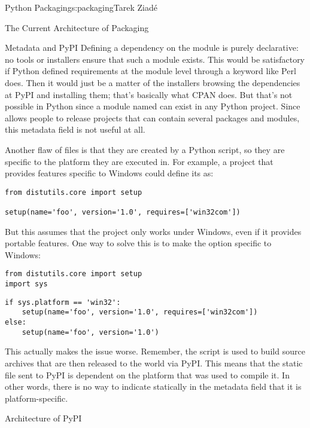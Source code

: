 \begin{aosachapter}{Python Packaging}{s:packaging}{Tarek Ziad\'{e}}
\begin{aosasect1}{The Current Architecture of Packaging}
\begin{aosasect2}{Metadata and PyPI}
Defining a dependency on the  module is purely declarative:
no tools or installers ensure that such a module exists.  This would be
satisfactory if Python defined requirements at the module level
through a  keyword like Perl does.  Then it would
just be a matter of the installers browsing the dependencies at PyPI
and installing them; that's basically what CPAN does.  But that's not
possible in Python since a module named  can exist in any
Python project. Since  allows people to release
projects that can contain several packages and modules, this metadata
field is not useful at all.

Another flaw of  files is that they are created by a
Python script, so they are specific to the platform they are executed
in.  For example, a project that provides features specific to Windows
could define its  as:

\begin{verbatim}
from distutils.core import setup

setup(name='foo', version='1.0', requires=['win32com'])
\end{verbatim}

\noindent But this assumes that the project only works under Windows, even if it
provides portable features.  One way to solve this is to make the
 option specific to Windows:

\begin{verbatim}
from distutils.core import setup
import sys
\end{verbatim}
\begin{verbatim}
if sys.platform == 'win32':
    setup(name='foo', version='1.0', requires=['win32com'])
else:
    setup(name='foo', version='1.0')
\end{verbatim}

\noindent This actually makes the issue worse. Remember, the script is used to
build source archives that are then released to the world via PyPI.
This means that the static  file sent to PyPI is
dependent on the platform that was used to compile it.  In other
words, there is no way to indicate statically in the metadata field
that it is platform-specific.

\end{aosasect2}

\begin{aosasect2}{Architecture of PyPI}



\end{aosasect2}
\end{aosasect1}
\end{aosachapter}
